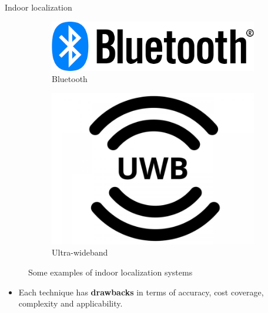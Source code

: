 \begin{frame}{Indoor localization}
\begin{figure}[!htb]
\begin{subfigure}[t]{0.24\textwidth}
            \end{subfigure}
            \hfill
            \begin{subfigure}[t]{0.24\textwidth}
                \centering
                \includegraphics[width=\linewidth]{images/bluetooth.png}
                \caption{Bluetooth}
                \label{fig:bluetooth}
            \end{subfigure}
            \hfill
            \begin{subfigure}[t]{0.24\textwidth}
                \centering
                \includegraphics[width=\linewidth]{images/uwb.jpg}
                \caption{Ultra-wideband}
                \label{fig:uwb}
            \end{subfigure}
               \caption{Some examples of indoor localization systems}
               \label{indoor}
        \end{figure}
    
        \begin{itemize}
        \item Each technique has \textbf{drawbacks} in terms of accuracy, cost coverage, complexity and applicability.
    \end{itemize}
\end{frame}

